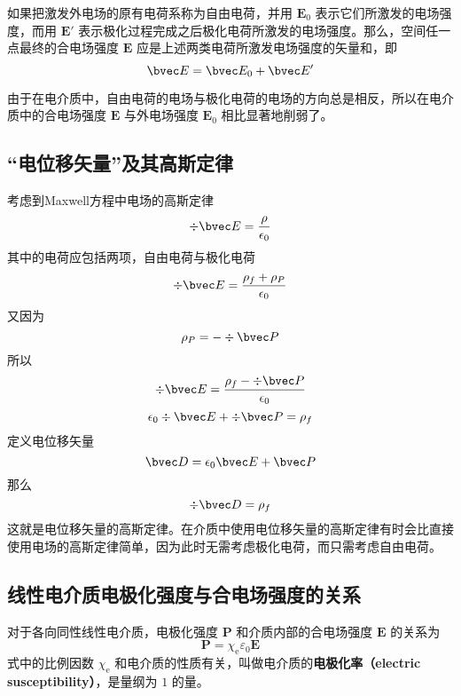 

如果把激发外电场的原有电荷系称为自由电荷，并用 $\mathbf E_0$ 表示它们所激发的电场强度，而用 $\mathbf E'$ 表示极化过程完成之后极化电荷所激发的电场强度。那么，空间任一点最终的合电场强度 $\mathbf E $ 应是上述两类电荷所激发电场强度的矢量和，即
\begin{equation}
\bvec E = \bvec E_{0} + \bvec E'
\end{equation}

由于在电介质中，自由电荷的电场与极化电荷的电场的方向总是相反，所以在电介质中的合电场强度 $\mathbf E $ 与外电场强度 $\mathbf E_0$ 相比显著地削弱了。

\subsection{“电位移矢量”及其高斯定律}
考虑到Maxwell方程中电场的高斯定律
$$\div \bvec E = \frac{\rho}{\epsilon_0}$$
其中的电荷应包括两项，自由电荷与极化电荷
$$\div \bvec E = \frac{\rho_f+\rho_P}{\epsilon_0}$$
又因为
$$\rho_P=-\div \bvec P$$
所以
$$\div \bvec E = \frac{\rho_f-\div \bvec P}{\epsilon_0}$$
$$\epsilon_0 \div \bvec E + \div \bvec P= \rho_f$$
定义电位移矢量 
\begin{equation}
\bvec D = \epsilon_0 \bvec E + \bvec P
\end{equation}
那么
\begin{equation}
\div \bvec D = \rho_f
\end{equation}
这就是电位移矢量的高斯定律。在介质中使用电位移矢量的高斯定律有时会比直接使用电场的高斯定律简单，因为此时无需考虑极化电荷，而只需考虑自由电荷。

\subsection{线性电介质电极化强度与合电场强度的关系}
对于各向同性线性电介质，电极化强度 $\mathbf P $ 和介质内部的合电场强度 $\mathbf E $ 的关系为%
\begin{equation} 
\mathbf P=\chi_{\mathrm e} \varepsilon_{0} \mathbf E
\end{equation}
式中的比例因数 $\chi_{\mathrm{e}}$ 和电介质的性质有关，叫做电介质的\textbf{电极化率（electric susceptibility）}，是量纲为 $1 $ 的量。

